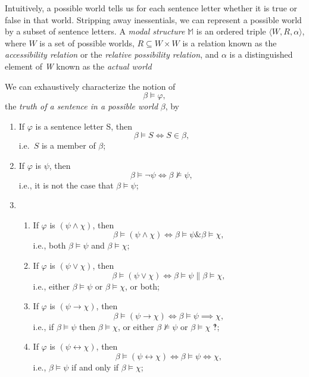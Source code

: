 \documentclass[
  12pt,
  letterpaper,
  DIV=11,
  numbers=noendperiod,
  twoside]{scrreprt}
\theoremstyle{remark}
\begin{document}
Intuitively, a possible world tells us for each sentence letter whether
it is true or false in that world. Stripping away inessentials, we can
represent a possible world by a subset of sentence letters. A
\emph{modal structure} \(\mathbb{M}\) is an ordered triple
\(\langle W, R,\alpha \rangle\), where \(W\) is a set of possible worlds, \(R\subseteq W\times W\) is a
relation known as the \emph{accessibility relation} or the
\emph{relative possibility relation}, and \(\alpha\) is a distinguished
element of \emph{W} known as the \emph{actual world}

We can exhaustively characterize the notion of \[\beta \vDash \varphi,\]
the \emph{truth of a sentence in a possible world} \(\beta\), by

\begin{enumerate}
\def\labelenumi{(\arabic{enumi})}
\setcounter{enumi}{3}
\item
  If \(\varphi\) is a sentence letter S, then \[
  \beta\vDash S \iff S\in\beta,
  \] i.e.~\(S\) is a member of \(\beta\);
\item
  If \(\varphi\) is \(\psi\), then \[
  \beta\vDash \neg\psi \iff \beta\not\vDash\psi,
  \] i.e., it is not the case that \(\beta\vDash\psi\);
\item
  \begin{enumerate}
  \def\labelenumii{(\alph{enumii})}
  \item
    If \(\varphi\) is \((\psi\land\chi)\), then \[
    \beta\vDash (\psi\land\chi) \iff \beta\vDash\psi \mathrel{\&} \beta\vDash\chi,
    \] i.e., both \(\beta\vDash\psi\) and \(\beta\vDash\chi\);
  \item
    If \(\varphi\) is \((\psi\lor\chi)\), then \[
    \beta\vDash (\psi\lor\chi) \iff \beta\vDash\psi \mathrel{\|} \beta\vDash\chi,
    \] i.e., either \(\beta\vDash\psi\) or \(\beta\vDash\chi\), or both;
  \item
    If \(\varphi\) is \((\psi\to\chi)\), then \[
    \beta\vDash (\psi\to\chi) \iff \beta\vDash\psi\implies\chi,
    \] i.e., if \(\beta\vDash\psi\) then \(\beta\vDash\chi\), or either
    \(\beta\not\vDash\psi\) or \(\beta\vDash\chi\) ‽;
  \item
    If \(\varphi\) is \((\psi\leftrightarrow\chi)\), then \[
    \beta\vDash (\psi\leftrightarrow\chi) \iff \beta\vDash\psi\iff\chi,
    \] i.e., \(\beta\vDash\psi\) if and only if \(\beta\vDash\chi\);
  \end{enumerate}
\end{enumerate}
\end{document}
